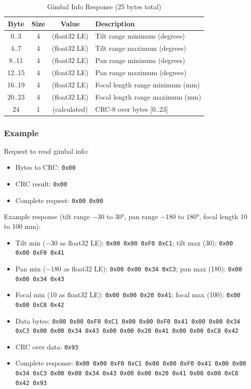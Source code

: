 \documentclass[12pt, titlepage]{article}
\begin{document}
\begin{table}[H]
  \centering
  \begin{tabular}{cccl}
    \toprule
    \textbf{Byte} & \textbf{Size} & \textbf{Value} & \textbf{Description}            \\
    \midrule
    0..3          & 4             & (float32 LE)   & Tilt range minimum (degrees)    \\
    4..7          & 4             & (float32 LE)   & Tilt range maximum (degrees)    \\
    8..11         & 4             & (float32 LE)   & Pan range minimum (degrees)     \\
    12..15        & 4             & (float32 LE)   & Pan range maximum (degrees)     \\
    16..19        & 4             & (float32 LE)   & Focal length range minimum (mm) \\
    20..23        & 4             & (float32 LE)   & Focal length range maximum (mm) \\
    24            & 1             & (calculated)   & CRC-8 over bytes [0..23]        \\
    \bottomrule
  \end{tabular}
  \caption{Gimbal Info Response (25 bytes total)}
\end{table}

\subsubsection{Example}

Request to read gimbal info:
\begin{itemize}
  \item Bytes to CRC: \texttt{0x00}
  \item CRC result: \texttt{0x00}
  \item Complete request: \texttt{0x00 0x00}
\end{itemize}

Example response (tilt range $-30$ to $30$°, pan range $-180$ to $180$°, focal
length 10 to 100 mm):
\begin{itemize}
  \item Tilt min ($-30$ as float32 LE): \texttt{0x00 0x00 0xF0 0xC1}; tilt max (30):
        \texttt{0x00 0x00 0xF0 0x41}
  \item Pan min ($-180$ as float32 LE): \texttt{0x00 0x00 0x34 0xC3}; pan max (180):
        \texttt{0x00 0x00 0x34 0x43}
  \item Focal min (10 as float32 LE): \texttt{0x00 0x00 0x20 0x41}; focal max (100):
        \texttt{0x00 0x00 0xC8 0x42}
  \item Data bytes: \texttt{0x00 0x00 0xF0 0xC1 0x00 0x00 0xF0 0x41 0x00 0x00 0x34 0xC3
          0x00 0x00 0x34 0x43 0x00 0x00 0x20 0x41 0x00 0x00 0xC8 0x42}
  \item CRC over data: \texttt{0x93}
  \item Complete response: \texttt{0x00 0x00 0xF0 0xC1 0x00 0x00 0xF0 0x41 0x00 0x00
          0x34 0xC3 0x00 0x00 0x34 0x43 0x00 0x00 0x20 0x41 0x00 0x00 0xC8 0x42 0x93}
\end{itemize}
\end{document}
